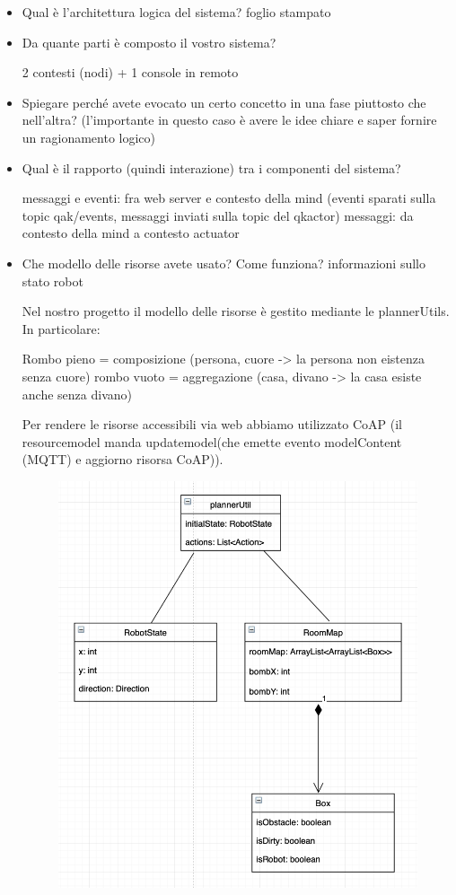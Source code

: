 \begin{itemize}
\item Qual è l’architettura logica del sistema? 
foglio stampato 

\item Da quante parti è composto il vostro sistema?

2 contesti (nodi) + 1 console in remoto 

\item Spiegare perché avete evocato un certo concetto in una fase piuttosto che nell'altra?
(l'importante in questo caso è avere le idee chiare e saper fornire un ragionamento logico)

\item Qual è il rapporto (quindi interazione) tra i componenti del sistema?

messaggi e eventi: fra web server e  contesto della mind (eventi sparati sulla topic qak/events, messaggi inviati sulla topic del qkactor)
messaggi: da contesto della mind a contesto actuator
	
\item Che modello delle risorse avete usato? Come funziona?
informazioni sullo stato robot 

Nel nostro progetto il modello delle risorse è gestito mediante le plannerUtils. In particolare:

Rombo pieno = composizione (persona, cuore -> la persona non eistenza senza cuore)
rombo vuoto = aggregazione (casa, divano -> la casa esiste anche senza divano)

Per rendere le risorse accessibili via web abbiamo utilizzato CoAP (il resourcemodel manda updatemodel(che emette evento modelContent (MQTT) e aggiorno risorsa CoAP)).

\begin{figure} [H]
\includegraphics[width=\linewidth]{img/modello_risorse_java.png}
\end{figure}



\end{itemize}

